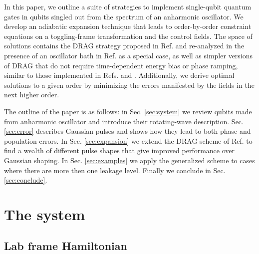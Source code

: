 \documentclass[pra,twocolumn,floatfix,superscriptaddress,eqsecnum]{revtex4-1}
\begin{document}
In this paper, we outline a suite of strategies to implement single-qubit quantum gates in qubits singled out from the spectrum of an anharmonic oscillator.
We develop an adiabatic expansion technique that leads to order-by-order constraint equations on a toggling-frame transformation and the control fields. The space of solutions contains the DRAG strategy proposed in Ref. \cite{Motzoi2009} and re-analyzed in the presence of an oscillator bath in Ref. \cite{Poudel10} as a special case, as well as simpler versions of DRAG that do not require time-dependent energy bias or phase ramping, similar to those
implemented in Refs. \cite{Chow2010a} and \cite{Lucero2010}. Additionally, we derive optimal solutions to a given order by minimizing the errors manifested by the fields in the next higher order. 

The outline of the paper is as follows: in Sec. \ref{sec:system} we review qubits made from anharmonic oscillator and introduce their rotating-wave description. Sec. \ref{sec:error} describes Gaussian pulses and shows how they lead to both phase and population errors. In Sec. \ref{sec:expansion} we extend the DRAG scheme of Ref. \cite{Motzoi2009} to find a wealth of different pulse shapes that give improved performance over Gaussian shaping. In Sec. \ref{sec:examples} we apply the generalized scheme to cases where there are more then one leakage level. Finally we conclude in Sec. \ref{sec:conclude}.


\section{The system \label{sec:system}}

\subsection{Lab frame Hamiltonian}
\end{document}
